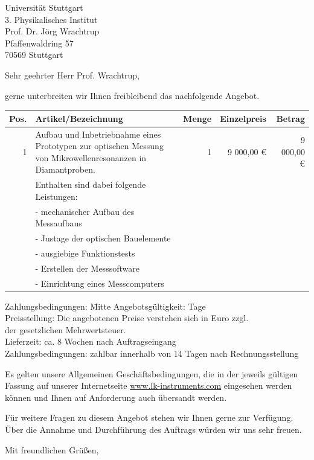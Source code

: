 \documentclass[DIN,
               paper=a4,
               fontsize=11pt,
               addrfield=on,
               enlargefirstpage=on,
               foldmarks=on,
               pagenumber=off,
               firsthead=on,
               firstfoot=on,
               parskip=full,
               addrfield=on,
               fromalign=right,
               fromemail=true,
               fromphone=true,
               fromurl=true,
               fromlogo=on,
               fromrule=off,
               numericaldate=off,
              ]{scrlttr2}
\begin{document}
\begin{letter}{Universität Stuttgart\\
               3. Physikalisches Institut\\
               Prof. Dr. Jörg Wrachtrup\\               
               Pfaffenwaldring 57\\
               70569 Stuttgart}
\opening{Sehr geehrter Herr Prof. Wrachtrup,}
gerne unterbreiten wir Ihnen freibleibend das nachfolgende Angebot.

\begin{tabular}{rp{7.5cm}rrr}
  \toprule
  \textbf{Pos.}&\textbf{Artikel/Bezeichnung}&\textbf{Menge}&\textbf{Einzelpreis}&\textbf{Betrag}\\
  \toprule
  1 & Aufbau und Inbetriebnahme eines Prototypen zur optischen Messung
	    von Mikrowellenresonanzen in Diamantproben. & 1 & 9 000,00 € & 9 000,00 € \\
	  & Enthalten sind dabei folgende Leistungen: & & & \\
	  & - mechanischer Aufbau des Messaufbaus & & & \\
	  & - Justage der optischen Bauelemente & & & \\
	  & - ausgiebige Funktionstests & & & \\
	  & - Erstellen der Messsoftware & & & \\
	  & - Einrichtung eines Messcomputers & & & \\
  \bottomrule
\end{tabular}
\begin{tabbing}
Zahlungsbedingungen: \= Mitte \kill
Angebotsgültigkeit:  Tage\\
Preisstellung:       \>Die angebotenen Preise verstehen sich in Euro zzgl. \\
\> der gesetzlichen Mehrwertsteuer.\\
Lieferzeit:         \>ca. 8 Wochen nach Auftragseingang\\
Zahlungsbedingungen:\> zahlbar innerhalb von 14 Tagen nach Rechnungsstellung\\
\end{tabbing}
Es gelten unsere Allgemeinen Geschäftsbedingungen, die in der jeweils
gültigen Fassung auf unserer Internetseite
\href{http://www.lk-instruments.com}{www.lk-instruments.com}
eingesehen werden können und Ihnen auf Anforderung auch übersandt werden.

Für weitere Fragen zu diesem Angebot stehen wir Ihnen gerne zur Verfügung.
Über die Annahme und Durchführung des Auftrags würden wir uns sehr freuen.
\closing{Mit freundlichen Grüßen,}


\end{letter}
\end{document}
